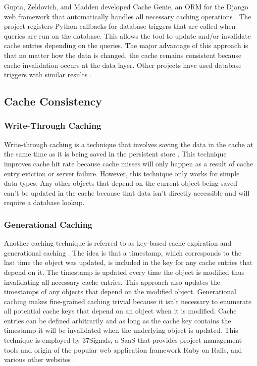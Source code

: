 \documentclass[12pt]{ucthesis}
\begin{document}
Gupta, Zeldovich, and Madden developed Cache Genie, an ORM for the Django web framework that automatically handles all necessary caching operations \cite{triggerBasedORM}.
The project registers Python callbacks for database triggers that are called when queries are run on the database.
This allows the tool to update and/or invalidate cache entries depending on the queries.
The major advantage of this approach is that no matter how the data is changed, the cache remains consistent because cache invalidation occurs at the data layer.
Other projects have used database triggers with similar results \cite{scalableConsistentCaching}.

\subsection{Cache Consistency}
\subsubsection{Write-Through Caching}
Write-through caching is a technique that involves saving the data in the cache at the same time as it is being saved in the persistent store \cite{writeThroughCaching}.
This technique improves cache hit rate because cache misses will only happen as a result of cache entry eviction or server failure.
However, this technique only works for simple data types.
Any other objects that depend on the current object being saved can't be updated in the cache because that data isn't directly accessible and will require a database lookup.

\subsubsection{Generational Caching}
Another caching technique is referred to as key-based cache expiration \cite{keyBasedCacheExpiration} and generational caching \cite{generationalCaching}.
The idea is that a timestamp, which corresponds to the last time the object was updated, is included in the key for any cache entries that depend on it.
The timestamp is updated every time the object is modified thus invalidating all necessary cache entries.
This approach also updates the timestamps of any objects that depend on the modified object.
Generational caching makes fine-grained caching trivial because it isn't necessary to enumerate all potential cache keys that depend on an object when it is modified.
Cache entries can be defined arbitrarily and as long as the cache key contains the timestamp it will be invalidated when the underlying object is updated.
This technique is employed by \textsf{37Signals}, a SaaS that provides project management tools and origin of the popular web application framework Ruby on Rails\cite{37SignalsDotCom}, and various other websites \cite{keyBasedCacheExpiration}.
\end{document}
